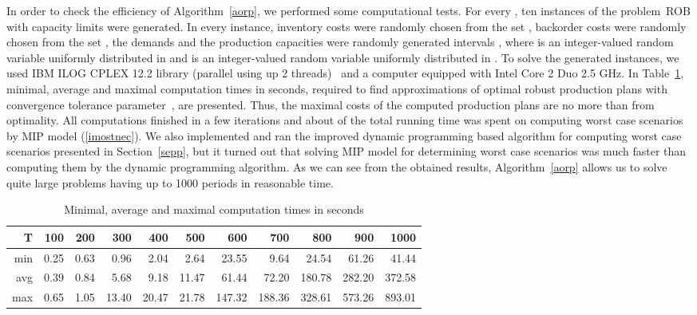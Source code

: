 \documentclass[11pt]{article}
\begin{document}
In order to check the efficiency of Algorithm~\ref{aorp},  we  performed some computational tests.
For every , ten instances of the problem~\textsc{ROB} 
 with capacity limits
were generated.
 In every instance, inventory costs were randomly chosen from the set , backorder costs were randomly chosen from the set , the demands  and the production capacities
 were randomly generated  intervals , where  is an integer-valued  random variable uniformly
 distributed in  and  is an integer-valued random variable uniformly
  distributed in . 
 To solve   the generated instances, we used  IBM ILOG CPLEX 12.2 library 
 (parallel using up 2 threads)~\cite{CPLEX} 
 and a
 computer equipped with Intel Core 2 Duo 2.5 GHz.
In Table~\ref{tab1new}, minimal, average and maximal computation times in seconds,
required to find approximations of  optimal robust production plans with 
convergence tolerance parameter~,
are presented. Thus,
 the maximal costs of the computed production plans are no more than 
from optimality.
All computations finished in a few iterations and about   of the total running time was spent on computing  worst case scenarios by MIP model (\ref{imostnec}).
We also  implemented and ran the improved dynamic programming based algorithm 
for computing  worst case scenarios presented in Section~\ref{sepp}, but
it turned out that solving MIP model for determining worst case scenarios
was much faster than  computing them
 by the dynamic programming algorithm.
As we can see from the obtained results, Algorithm~\ref{aorp} allows us to solve quite large problems having up to 1000 periods in reasonable time.


\begin{table}
\begin{small}
\setlength{\tabcolsep}{4pt}
\caption{Minimal, average and maximal computation times in seconds} 
\label{tab1new}
\begin{center}
\begin{tabular}{r|rrrrrrrrrr}
T & 100 &  200 & 300 & 400 & 500 &
 600 &  700 & 800 & 900 & 1000\\
\hline 
min & 0.25 & 0.63 & 0.96 & 2.04 & 2.64 
               & 23.55 & 9.64 & 24.54 & 61.26 &  41.44  \\ 
avg & 0.39 & 0.84 & 5.68 & 9.18 & 11.47 
                & 61.44 & 72.20 & 180.78  & 282.20 &  372.58 \\ 
max &0.65 & 1.05 & 13.40 & 20.47 & 21.78 
                & 147.32 & 188.36 & 328.61 & 573.26 & 893.01 
\end{tabular}
\end{center}
\end{small}
\end{table}
\end{document}
